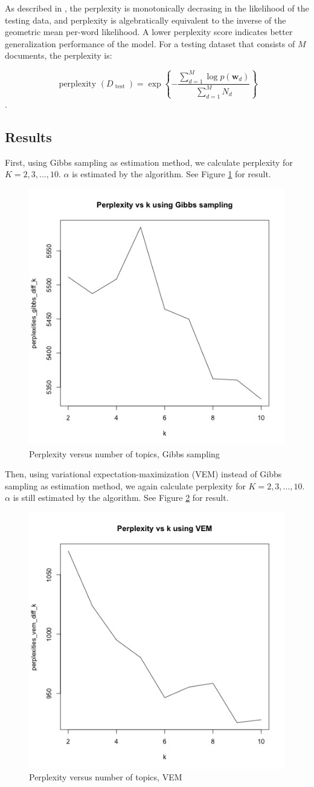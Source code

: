 \documentclass{article}
\begin{document}
As described in \cite{blei2003latent}, the perplexity is monotonically decrasing in the likelihood of the testing data, and perplexity is algebratically equivalent to the inverse of the geometric mean per-word likelihood. A lower perplexity score indicates better generalization performance of the model. For a testing dataset that consists of $M$ documents, the perplexity is:

$$
\text { perplexity }\left(D_{\text { test }}\right)=\exp \left\{-\frac{\sum_{d=1}^{M} \log p\left(\mathbf{w}_{d}\right)}{\sum_{d=1}^{M} N_{d}}\right\}
$$.


\subsection{Results}

First, using Gibbs sampling as estimation method, we calculate perplexity for $K = 2, 3, ..., 10$. $\alpha$ is estimated by the algorithm. See Figure \ref{fig:gibbs_diff_k_10} for result.

\begin{figure}[h]
  \centering
  \includegraphics[width=0.5\linewidth]{images/gibbs_diff_k.jpg}
  \caption{Perplexity versus number of topics, Gibbs sampling}
  \label{fig:gibbs_diff_k_10}
\end{figure}

Then, using variational expectation-maximization (VEM) instead of Gibbs sampling as estimation method, we again calculate perplexity for $K = 2, 3, ..., 10$. $\alpha$ is still estimated by the algorithm. See Figure \ref{fig:vem_diff_k_10} for result.

\begin{figure}[h]
  \centering
  \includegraphics[width=0.5\linewidth]{images/vem_diff_k.jpg}
  \caption{Perplexity versus number of topics, VEM}
  \label{fig:vem_diff_k_10}
\end{figure}
\end{document}
